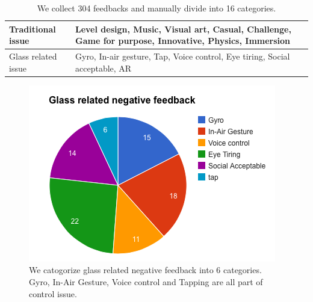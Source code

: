  \begin{table}[!h]
\newcommand{\tabincell}[2]{\begin{tabular}{@{}#1@{}}#2\end{tabular}}
   \centering
   \begin{tabular}{|p{}|p{}|}
     \hline
     \multicolumn{1}{|p{0.3\columnwidth}|}{Traditional issue} &
     \multicolumn{1}{|p{0.5\columnwidth}|}{Level design, Music, Visual art, Casual, Challenge, Game for purpose, Innovative, Physics, Immersion} \\
     \hline
     \multicolumn{1}{|p{0.3\columnwidth}|}{Glass related issue} & 
     \multicolumn{1}{|p{0.5\columnwidth}|}{Gyro, In-air gesture, Tap, Voice control, Eye tiring, Social acceptable, AR} \\
     \hline
   \end{tabular}
   \caption{We collect 304 feedbacks and manually divide into 16 categories.}
   \label{tab:issueType}
 \end{table}


\begin{figure}[!t]
\centering
\includegraphics[width=0.9\columnwidth]{Figures/US1_userfeedbackStatistics.png}
\caption{We catogorize glass related negative feedback into 6 categories. Gyro, In-Air Gesture, Voice control and Tapping are all part of control issue.}
\label{fig:negativeFeedback}
\end{figure}


